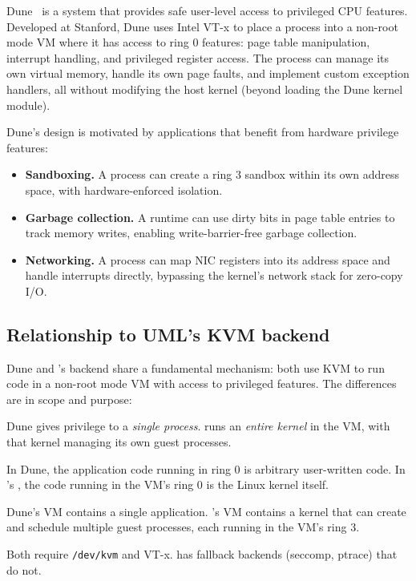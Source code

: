 Dune~\cite{belay2012} is a system that provides safe user-level
access to privileged CPU features.  Developed at Stanford, Dune uses
Intel VT-x to place a process into a non-root mode VM where it has
access to ring 0 features: page table manipulation, interrupt
handling, and privileged register access.  The process can manage
its own virtual memory, handle its own page faults, and implement
custom exception handlers, all without modifying the host kernel
(beyond loading the Dune kernel module).

Dune's design is motivated by applications that benefit from
hardware privilege features:

\begin{itemize}[leftmargin=2em]
  \item \textbf{Sandboxing.}  A process can create a ring 3 sandbox
        within its own address space, with hardware-enforced isolation.
  \item \textbf{Garbage collection.}  A runtime can use dirty bits
        in page table entries to track memory writes, enabling
        write-barrier-free garbage collection.
  \item \textbf{Networking.}  A process can map NIC registers into
        its address space and handle interrupts directly, bypassing
        the kernel's network stack for zero-copy I/O.
\end{itemize}

\subsection{Relationship to UML's KVM backend}

Dune and \UML{}'s \KVMvTwo{} backend share a fundamental mechanism:
both use KVM to run code in a non-root mode VM with access to
privileged features.  The differences are in scope and purpose:

\begin{description}[style=nextline,leftmargin=2em]
  \item[Scope.]
    Dune gives privilege to a \emph{single process}.  \KVMvTwo{}
    runs an \emph{entire kernel} in the VM, with that kernel managing
    its own guest processes.

  \item[Kernel involvement.]
    In Dune, the application code running in ring 0 is arbitrary
    user-written code.  In \UML{}'s \KVMvTwo{}, the code running
    in the VM's ring 0 is the Linux kernel itself.

  \item[Process model.]
    Dune's VM contains a single application.  \UML{}'s VM contains
    a kernel that can create and schedule multiple guest processes,
    each running in the VM's ring 3.

  \item[Hardware requirements.]
    Both require \texttt{/dev/kvm} and VT-x.  \UML{} has fallback
    backends (seccomp, ptrace) that do not.
\end{description}

